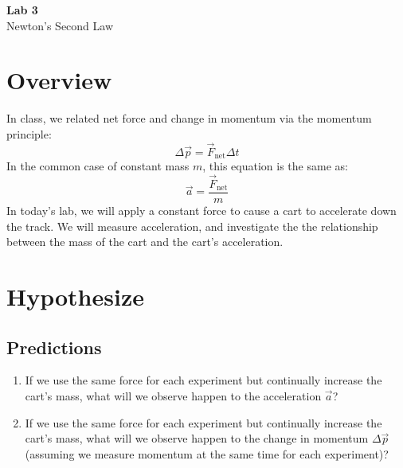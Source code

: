 \documentclass{article}
\begin{document}
\fancyfoot[C]{\thepage}
\vspace*{0cm}
\begin{center}
	{\LARGE \textbf{Lab 3}}\\
	\vspace{.25cm}
	{\Large Newton's Second Law}
\end{center}

\section*{Overview}
In class, we related net force and change in momentum via the momentum principle:
\begin{equation}
\Delta \vec{p} = \vec{F}_\mathrm{net}\Delta t
\end{equation}
In the common case of constant mass $m$, this equation is the same as:
\begin{equation}
\vec{a}=\frac{ \vec{F}_\mathrm{net}}{m}
\end{equation}
In today's lab, we will apply a constant force to cause a cart to accelerate down the track. We will measure acceleration, and investigate the the relationship between the mass of the cart and the cart's acceleration.

\section*{Hypothesize}
\subsection*{Predictions}
\begin{enumerate}
	\item If we use the same force for each experiment but continually increase the cart's mass, what will we observe happen to the acceleration $\vec{a}$?
	\item If we use the same force for each experiment but continually increase the cart's mass, what will we observe happen to the change in momentum $\Delta\vec{p}$ (assuming we measure momentum at the same time for each experiment)?
\end{enumerate}
\end{document}
